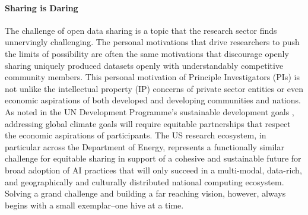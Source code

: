 \paragraph{Sharing is Daring}
The challenge of open data sharing is a topic that the research sector finds unnervingly challenging.
The personal motivations that drive researchers to push the limits of possibility are often the same motivations that discourage openly sharing uniquely produced datasets openly with understandably competitive community members.
This personal motivation of Principle Investigators (PIs) is not unlike the intellectual property (IP) concerns of private sector entities or even economic aspirations of both developed and developing communities and nations.
As noted in the UN Development Programme's sustainable development goals \cite{SDGs}, addressing global climate goals will require equitable partnerships that respect the economic aspirations of participants.
The US research ecosystem, in particular across the Department of Energy, represents a functionally similar challenge for equitable sharing in support of a cohesive and sustainable future for broad adoption of AI practices that will only succeed in a multi-modal, data-rich, and geographically and culturally distributed national computing ecosystem.
Solving a grand challenge and building a far reaching vision, however, always begins with a small exemplar--one hive at a time.



